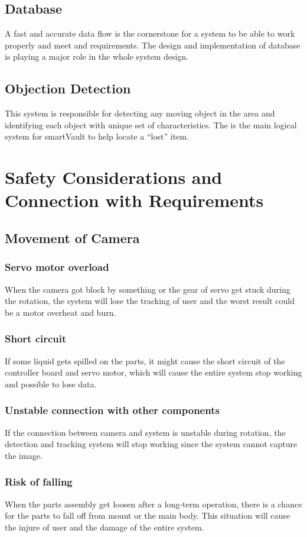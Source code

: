 \documentclass{article}
\begin{document}
\subsection{Database}
A fast and accurate data flow is the cornerstone for a system to be able to work properly and meet and requirements. The design and implementation of database is playing a major role in the whole system design.
\subsection{Objection Detection}
This system is responsible for detecting any moving object in the area and identifying each object with unique set of characteristics. The is the main logical system for smartVault to help locate a “lost” item.
\section{Safety Considerations and Connection with Requirements}
\subsection{Movement of Camera}
\subsubsection{Servo motor overload}
When the camera got block by something or the gear of servo get stuck during the rotation, the system will lose the tracking of user and the worst result could be a motor overheat and burn.
\subsubsection{Short circuit}
If some liquid gets spilled on the parts, it might cause the short circuit of the controller board and servo motor, which will cause the entire system stop working and possible to lose data.

\subsubsection{Unstable connection with other components}
If the connection between camera and system is unstable during rotation, the detection and tracking system will stop working since the system cannot capture the image.

\subsubsection{Risk of falling}
When the parts assembly get loosen after a long-term operation, there is a chance for the parts to fall off from mount or the main body. This situation will cause the injure of user and the damage of the entire system.
\end{document}
